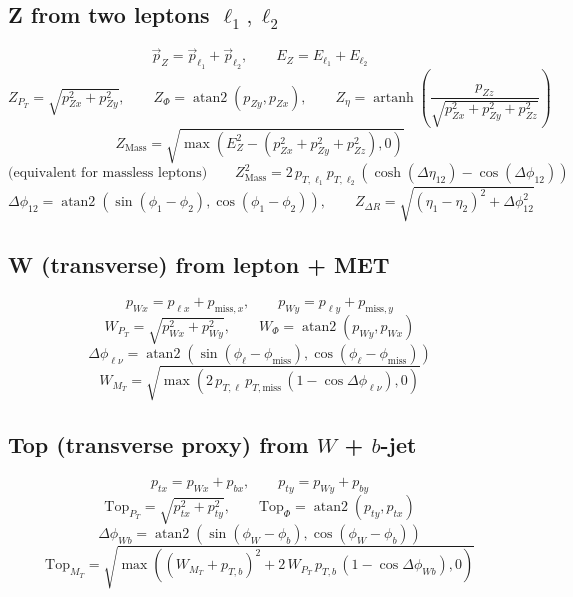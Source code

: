\documentclass{article}
\begin{document}
\subsection*{Z from two leptons $\ell_1,\ell_2$}
\[
\vec{p}_Z = \vec{p}_{\ell_1}+\vec{p}_{\ell_2}, \qquad E_Z = E_{\ell_1}+E_{\ell_2}
\]
\[
Z_{P_T}=\sqrt{p_{Zx}^2+p_{Zy}^2},
\qquad
Z_{\Phi}=\operatorname{atan2}(p_{Zy},p_{Zx}),
\qquad
Z_{\eta}=\operatorname{artanh}\!\left(\frac{p_{Zz}}{\sqrt{p_{Zx}^2+p_{Zy}^2+p_{Zz}^2}}\right)
\]
\[
Z_{\mathrm{Mass}} = \sqrt{\max\!\left(E_Z^2-\left(p_{Zx}^2+p_{Zy}^2+p_{Zz}^2\right),0\right)}
\]
\[
\text{(equivalent for massless leptons)}\qquad
Z_{\mathrm{Mass}}^2 = 2\,p_{T,\ell_1}p_{T,\ell_2}\left(\cosh(\Delta\eta_{12})-\cos(\Delta\phi_{12})\right)
\]
\[
\Delta\phi_{12}=\operatorname{atan2}(\sin(\phi_1-\phi_2),\cos(\phi_1-\phi_2)),
\qquad
Z_{\Delta R}=\sqrt{(\eta_1-\eta_2)^2+\Delta\phi_{12}^2}
\]

\subsection*{W (transverse) from lepton + MET}
\[
p_{Wx}=p_{\ell x}+p_{\mathrm{miss},x},
\qquad
p_{Wy}=p_{\ell y}+p_{\mathrm{miss},y}
\]
\[
W_{P_T}=\sqrt{p_{Wx}^2+p_{Wy}^2},
\qquad
W_{\Phi}=\operatorname{atan2}(p_{Wy},p_{Wx})
\]
\[
\Delta\phi_{\ell\nu}=\operatorname{atan2}(\sin(\phi_\ell-\phi_{\mathrm{miss}}),\cos(\phi_\ell-\phi_{\mathrm{miss}}))
\]
\[
W_{M_T}=\sqrt{\max\!\left(2\,p_{T,\ell}\,p_{T,\mathrm{miss}}\,(1-\cos\Delta\phi_{\ell\nu}),0\right)}
\]

\subsection*{Top (transverse proxy) from $W$ + $b$-jet}
\[
p_{tx}=p_{Wx}+p_{bx},
\qquad
p_{ty}=p_{Wy}+p_{by}
\]
\[
\mathrm{Top}_{P_T}=\sqrt{p_{tx}^2+p_{ty}^2},
\qquad
\mathrm{Top}_{\Phi}=\operatorname{atan2}(p_{ty},p_{tx})
\]
\[
\Delta\phi_{Wb}=\operatorname{atan2}(\sin(\phi_W-\phi_b),\cos(\phi_W-\phi_b))
\]
\[
\mathrm{Top}_{M_T}=\sqrt{\max\!\left((W_{M_T}+p_{T,b})^2+2\,W_{P_T}\,p_{T,b}\,(1-\cos\Delta\phi_{Wb}),0\right)}
\]
\end{document}
